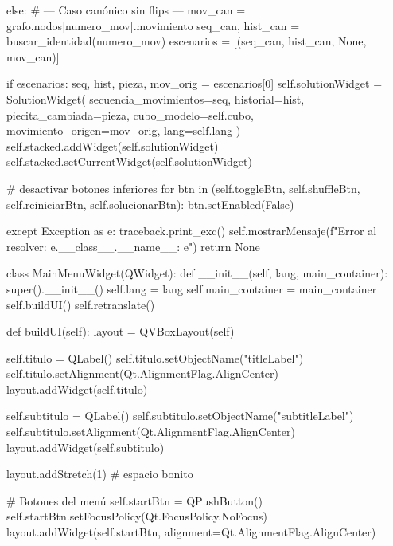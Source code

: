             else:
                # --- Caso canónico sin flips ---
                mov_can = grafo.nodos[numero_mov].movimiento
                seq_can, hist_can = buscar_identidad(numero_mov)
                escenarios = [(seq_can, hist_can, None, mov_can)]

            if escenarios:
                seq, hist, pieza, mov_orig = escenarios[0]
                self.solutionWidget = SolutionWidget(
                    secuencia_movimientos=seq,
                    historial=hist,
                    piecita_cambiada=pieza,
                    cubo_modelo=self.cubo,
                    movimiento_origen=mov_orig,
                    lang=self.lang
                )
                self.stacked.addWidget(self.solutionWidget)
                self.stacked.setCurrentWidget(self.solutionWidget)

                # desactivar botones inferiores
                for btn in (self.toggleBtn, self.shuffleBtn,
                            self.reiniciarBtn, self.solucionarBtn):
                    btn.setEnabled(False)

                
            
        except Exception as e:
            traceback.print_exc()
            self.mostrarMensaje(f"Error al resolver: {e.__class__.__name__}: {e}")
            return None

class MainMenuWidget(QWidget):
    def __init__(self, lang, main_container):
        super().__init__()
        self.lang = lang
        self.main_container = main_container
        self.buildUI()
        self.retranslate()
        
    def buildUI(self):
        layout = QVBoxLayout(self)

        self.titulo = QLabel()
        self.titulo.setObjectName("titleLabel")
        self.titulo.setAlignment(Qt.AlignmentFlag.AlignCenter)
        layout.addWidget(self.titulo)
        
        self.subtitulo = QLabel()
        self.subtitulo.setObjectName("subtitleLabel")
        self.subtitulo.setAlignment(Qt.AlignmentFlag.AlignCenter)
        layout.addWidget(self.subtitulo)
        
        layout.addStretch(1) # espacio bonito
        
        # Botones del menú
        self.startBtn = QPushButton()
        self.startBtn.setFocusPolicy(Qt.FocusPolicy.NoFocus)
        layout.addWidget(self.startBtn, alignment=Qt.AlignmentFlag.AlignCenter)

